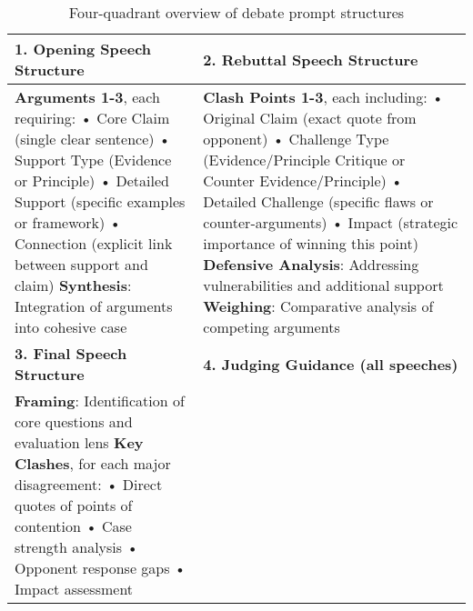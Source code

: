 \documentclass{article}
\begin{document}
\begin{table}[h]
\centering
\caption{Four-quadrant overview of debate prompt structures}
\label{tab:prompt_structure}
\begin{tabular}{|p{}|p{}|}
\hline
\textbf{1. Opening Speech Structure} & \textbf{2. Rebuttal Speech Structure} \\
\hline
\textbf{Arguments 1-3}, each requiring:
\vspace{2pt}
\newline • Core Claim (single clear sentence)
\newline • Support Type (Evidence or Principle)
\newline • Detailed Support (specific examples or framework)
\newline • Connection (explicit link between support and claim)
\vspace{4pt}
\newline \textbf{Synthesis}: Integration of arguments into cohesive case
&
\textbf{Clash Points 1-3}, each including:
\vspace{2pt}
\newline • Original Claim (exact quote from opponent)
\newline • Challenge Type (Evidence/Principle Critique or Counter Evidence/Principle)
\newline • Detailed Challenge (specific flaws or counter-arguments)
\newline • Impact (strategic importance of winning this point)
\vspace{4pt}
\newline \textbf{Defensive Analysis}: Addressing vulnerabilities and additional support
\newline \textbf{Weighing}: Comparative analysis of competing arguments
\\
\hline
\textbf{3. Final Speech Structure} & \textbf{4. Judging Guidance (all speeches)} \\
\hline
\textbf{Framing}: Identification of core questions and evaluation lens
\vspace{4pt}
\newline \textbf{Key Clashes}, for each major disagreement:
\vspace{2pt}
\newline • Direct quotes of points of contention
\newline • Case strength analysis
\newline • Opponent response gaps
\newline • Impact assessment

\end{tabular}
\end{table}
\end{document}
